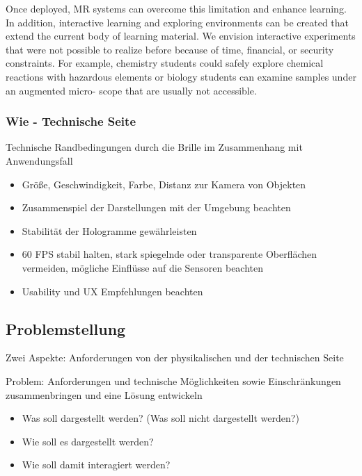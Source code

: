 Once deployed, MR systems can overcome this limitation and enhance learning. In addition, interactive learning and exploring environments can be created that extend the current body of learning material. We envision interactive experiments that were not possible to realize before because of time, financial, or security constraints. For example, chemistry students could safely explore chemical reactions with hazardous elements or biology students can examine samples under an augmented micro- scope that are usually not accessible.

\subsubsection{Wie - Technische Seite}

Technische Randbedingungen durch die Brille im Zusammenhang mit Anwendungsfall
\begin{itemize}
	\item Größe, Geschwindigkeit, Farbe, Distanz zur Kamera von Objekten
	\item Zusammenspiel der Darstellungen mit der Umgebung beachten
	\item Stabilität der Hologramme gewährleisten
	\item 60 FPS stabil halten, stark spiegelnde oder transparente Oberflächen vermeiden, mögliche Einflüsse auf die Sensoren beachten
	\item Usability und UX Empfehlungen beachten
\end{itemize}

\subsection{Problemstellung}
\label{sec-3-2}
Zwei Aspekte: Anforderungen von der physikalischen und der technischen Seite

Problem: Anforderungen und technische Möglichkeiten sowie Einschränkungen zusammenbringen und eine Lösung entwickeln
\begin{itemize}
	\item Was soll dargestellt werden? (Was soll nicht dargestellt werden?)
	\item Wie soll es dargestellt werden?
	\item Wie soll damit interagiert werden?
\end{itemize}

